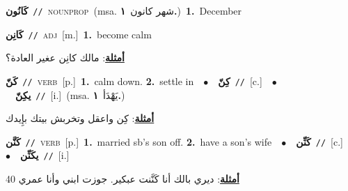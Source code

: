 \documentclass[10pt,a4paper,twoside]{article} %
\begin{document}
\begin{multicols}{2}
{\setlength\topsep{0pt}\textbf{\foreignlanguage{arabic}{كَانُون}}\ {\color{gray}\texttt{//}\color{black}}\ \textsc{noun\textunderscore prop}\ \color{gray}(msa. \foreignlanguage{arabic}{شهر كانون}~\foreignlanguage{arabic}{\textbf{١.}})\color{black}\ \textbf{1.}~December\ } \vspace{2mm}

{\setlength\topsep{0pt}\textbf{\foreignlanguage{arabic}{كَانِن}}\ {\color{gray}\texttt{//}\color{black}}\ \textsc{adj}\ [m.]\ \textbf{1.}~become calm\  \begin{flushright}\color{gray}\foreignlanguage{arabic}{\textbf{\underline{\foreignlanguage{arabic}{أمثلة}}}: مالك كانِن عغير العادة؟}\end{flushright}\color{black}} \vspace{2mm}

{\setlength\topsep{0pt}\textbf{\foreignlanguage{arabic}{كَنّ}}\ {\color{gray}\texttt{//}\color{black}}\ \textsc{verb}\ [p.]\ \textbf{1.}~calm down.  \textbf{2.}~settle in\ \ $\bullet$\ \ \setlength\topsep{0pt}\textbf{\foreignlanguage{arabic}{كِنّ}}\ {\color{gray}\texttt{//}\color{black}}\ [c.]\ \ $\bullet$\ \ \setlength\topsep{0pt}\textbf{\foreignlanguage{arabic}{يكِنّ}}\ {\color{gray}\texttt{//}\color{black}}\ [i.]\ \color{gray}(msa. \foreignlanguage{arabic}{يَهْدَأ}~\foreignlanguage{arabic}{\textbf{١.}})\color{black}\  \begin{flushright}\color{gray}\foreignlanguage{arabic}{\textbf{\underline{\foreignlanguage{arabic}{أمثلة}}}: كِن واعقل وتخربش بيتك بإِيدك}\end{flushright}\color{black}} \vspace{2mm}

{\setlength\topsep{0pt}\textbf{\foreignlanguage{arabic}{كَنَّن}}\ {\color{gray}\texttt{//}\color{black}}\ \textsc{verb}\ [p.]\ \textbf{1.}~married sb's son off.  \textbf{2.}~have a son's wife\ \ $\bullet$\ \ \setlength\topsep{0pt}\textbf{\foreignlanguage{arabic}{كَنِّن}}\ {\color{gray}\texttt{//}\color{black}}\ [c.]\ \ $\bullet$\ \ \setlength\topsep{0pt}\textbf{\foreignlanguage{arabic}{يكَنِّن}}\ {\color{gray}\texttt{//}\color{black}}\ [i.]\  \begin{flushright}\color{gray}\foreignlanguage{arabic}{\textbf{\underline{\foreignlanguage{arabic}{أمثلة}}}: ديري بالك أنا كَنَّنت عبكير. جوزت ابني وأنا عمري 40}\end{flushright}\color{black}} \vspace{2mm}


\end{multicols}
\end{document}
